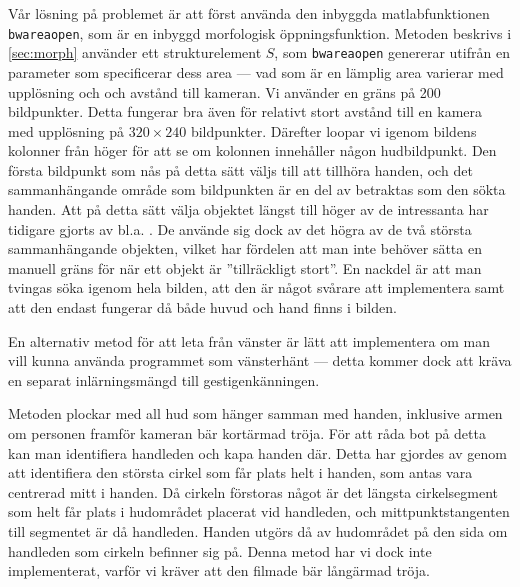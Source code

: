 Vår lösning på problemet är att först använda den inbyggda
matlabfunktionen \texttt{bwareaopen}, som är en inbyggd morfologisk
öppningsfunktion. Metoden beskrivs i
\ref{sec:morph} använder ett strukturelement $S$, som \texttt{bwareaopen}
genererar utifrån en parameter som specificerar
dess area --- vad som är en lämplig area
varierar med upplösning och
och avstånd till kameran. Vi använder en gräns på 200
bildpunkter. Detta fungerar bra även för relativt stort avstånd till
 en kamera med upplösning på $320\times240$ bildpunkter. Därefter loopar vi
igenom bildens kolonner från
höger för att se om kolonnen innehåller någon hudbildpunkt. Den första
bildpunkt som nås på detta sätt väljs till att tillhöra handen, och det
sammanhängande område som bildpunkten är en del av betraktas som den sökta
handen. Att på detta sätt välja objektet längst till höger av de
intressanta har tidigare gjorts av bl.a. . De använde
sig dock av det högra av de två största sammanhängande objekten,
vilket har fördelen att man inte behöver sätta en manuell gräns för
när ett objekt är ''tillräckligt stort''. En nackdel är att man tvingas
söka igenom hela bilden, att den är något svårare att
implementera samt att den endast fungerar då både huvud och hand finns
i bilden.

En alternativ metod för att leta från
vänster är lätt att implementera om man vill kunna använda programmet
som vänsterhänt --- detta kommer dock att kräva en
separat inlärningsmängd till gestigenkänningen.

Metoden plockar med all hud som hänger samman med
handen, inklusive armen om personen framför kameran bär kortärmad tröja. För att
råda bot på detta kan man identifiera handleden och kapa handen
där. Detta har gjordes av  genom att identifiera den största cirkel
som får plats helt i handen, som antas vara centrerad mitt i handen. Då
cirkeln förstoras något är det längsta cirkelsegment som helt får
plats i hudområdet placerat vid handleden, och mittpunktstangenten
till segmentet är då handleden. Handen utgörs då av hudområdet på den
sida om handleden som cirkeln befinner sig på. Denna metod har vi dock
inte implementerat, varför vi kräver att den filmade bär
långärmad tröja. 
